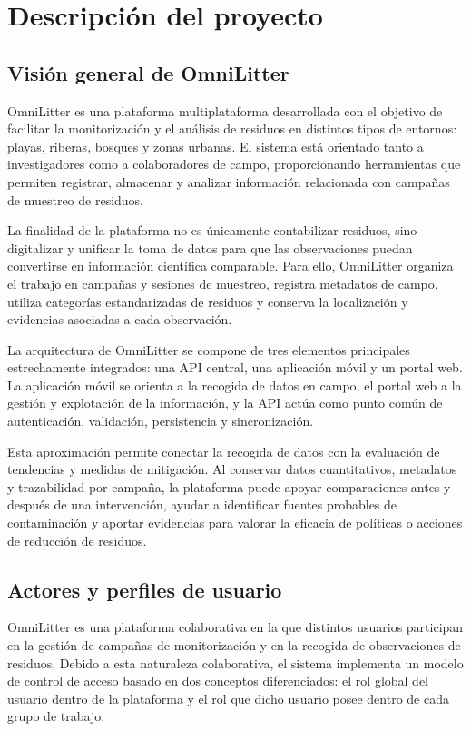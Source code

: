 \chapter{Descripción del proyecto}

\section{Visión general de OmniLitter}

OmniLitter es una plataforma multiplataforma desarrollada con el objetivo de facilitar la monitorización y el análisis de residuos en distintos tipos de entornos: playas, riberas, bosques y zonas urbanas. El sistema está orientado tanto a investigadores como a colaboradores de campo, proporcionando herramientas que permiten registrar, almacenar y analizar información relacionada con campañas de muestreo de residuos.

La finalidad de la plataforma no es únicamente contabilizar residuos, sino digitalizar y unificar la toma de datos para que las observaciones puedan convertirse en información científica comparable. Para ello, OmniLitter organiza el trabajo en campañas y sesiones de muestreo, registra metadatos de campo, utiliza categorías estandarizadas de residuos y conserva la localización y evidencias asociadas a cada observación.

La arquitectura de OmniLitter se compone de tres elementos principales estrechamente
integrados: una API central, una aplicación móvil y un portal web. La aplicación
móvil se orienta a la recogida de datos en campo, el portal web a la gestión y
explotación de la información, y la API actúa como punto común de autenticación,
validación, persistencia y sincronización.

Esta aproximación permite conectar la recogida de datos con la evaluación de tendencias y medidas de mitigación. Al conservar datos cuantitativos, metadatos y trazabilidad por campaña, la plataforma puede apoyar comparaciones antes y después de una intervención, ayudar a identificar fuentes probables de contaminación y aportar evidencias para valorar la eficacia de políticas o acciones de reducción de residuos.

\section{Actores y perfiles de usuario}

OmniLitter es una plataforma colaborativa en la que distintos usuarios participan en la gestión de campañas de monitorización y en la recogida de observaciones de residuos. Debido a esta naturaleza colaborativa, el sistema implementa un modelo de control de acceso basado en dos conceptos diferenciados: el rol global del usuario dentro de la plataforma y el rol que dicho usuario posee dentro de cada grupo de trabajo.

